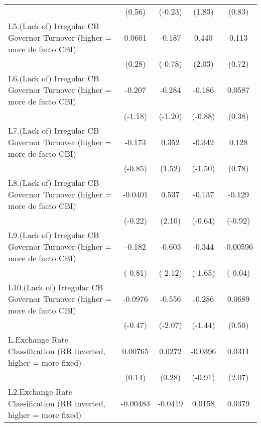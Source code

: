 {\begin{longtable}{l*{4}{c}}
                &   (0.56)         &  (-0.23)         &   (1.83)         &   (0.83)         \\
[1em]
L5.(Lack of) Irregular CB Governor Turnover (higher = more de facto CBI)&   0.0601         &   -0.187         &    0.440\sym{*}  &    0.113         \\
                &   (0.28)         &  (-0.78)         &   (2.03)         &   (0.72)         \\
[1em]
L6.(Lack of) Irregular CB Governor Turnover (higher = more de facto CBI)&   -0.207         &   -0.284         &   -0.186         &   0.0587         \\
                &  (-1.18)         &  (-1.20)         &  (-0.88)         &   (0.38)         \\
[1em]
L7.(Lack of) Irregular CB Governor Turnover (higher = more de facto CBI)&   -0.173         &    0.352         &   -0.342         &    0.128         \\
                &  (-0.85)         &   (1.52)         &  (-1.50)         &   (0.78)         \\
[1em]
L8.(Lack of) Irregular CB Governor Turnover (higher = more de facto CBI)&  -0.0401         &    0.537\sym{*}  &   -0.137         &   -0.129         \\
                &  (-0.22)         &   (2.10)         &  (-0.64)         &  (-0.92)         \\
[1em]
L9.(Lack of) Irregular CB Governor Turnover (higher = more de facto CBI)&   -0.182         &   -0.603\sym{*}  &   -0.344         & -0.00596         \\
                &  (-0.81)         &  (-2.12)         &  (-1.65)         &  (-0.04)         \\
[1em]
L10.(Lack of) Irregular CB Governor Turnover (higher = more de facto CBI)&  -0.0976         &   -0.556\sym{*}  &   -0.286         &   0.0689         \\
                &  (-0.47)         &  (-2.07)         &  (-1.44)         &   (0.50)         \\
[1em]
L.Exchange Rate Classification (RR inverted, higher = more fixed)&  0.00765         &   0.0272         &  -0.0396         &   0.0311\sym{*}  \\
                &   (0.14)         &   (0.28)         &  (-0.91)         &   (2.07)         \\
[1em]
L2.Exchange Rate Classification (RR inverted, higher = more fixed)& -0.00483         &  -0.0419         &   0.0158         &   0.0379\sym{*}  \\

\end{longtable}}
